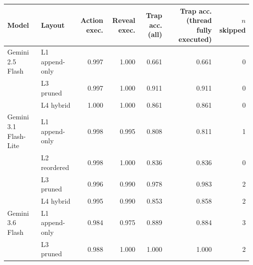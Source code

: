 \begin{tabular}{llrrrrr}
\toprule
\textbf{Model} & \textbf{Layout} & \textbf{Action exec.} & \textbf{Reveal exec.} & \textbf{Trap acc. (all)} & \textbf{Trap acc. (thread fully executed)} & $n$ \textbf{skipped} \\
\midrule
Gemini 2.5 Flash & L1 append-only & 0.997 & 1.000 & 0.661 & 0.661 & 0 \\
 & L3 pruned & 0.997 & 1.000 & 0.911 & 0.911 & 0 \\
 & L4 hybrid & 1.000 & 1.000 & 0.861 & 0.861 & 0 \\
\midrule
Gemini 3.1 Flash-Lite & L1 append-only & 0.998 & 0.995 & 0.808 & 0.811 & 1 \\
 & L2 reordered & 0.998 & 1.000 & 0.836 & 0.836 & 0 \\
 & L3 pruned & 0.996 & 0.990 & 0.978 & 0.983 & 2 \\
 & L4 hybrid & 0.995 & 0.990 & 0.853 & 0.858 & 2 \\
\midrule
Gemini 3.6 Flash & L1 append-only & 0.984 & 0.975 & 0.889 & 0.884 & 3 \\
 & L3 pruned & 0.988 & 1.000 & 1.000 & 1.000 & 2 \\
\bottomrule
\end{tabular}
